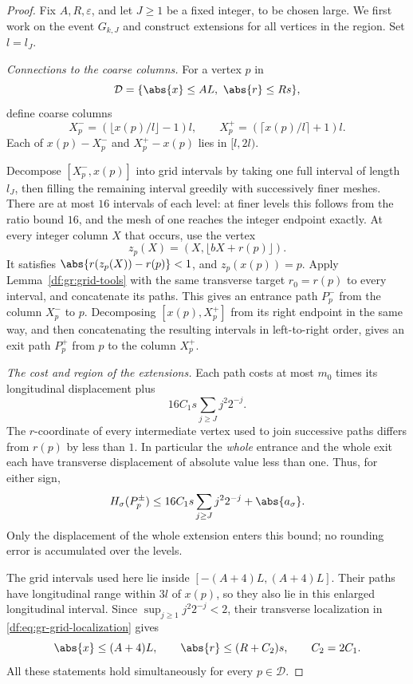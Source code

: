 \begin{proof}
Fix $A,R,\varepsilon$, and let $J\geq1$ be a fixed integer, to be chosen large.
We first work on the event $G_{k,J}$ and construct extensions for all
vertices in the region. Set $l=l_J$.

\emph{Connections to the coarse columns.}
For a vertex $p$ in
\[
 \mathcal D=\{\abs{x}\leq AL,\ \abs{r}\leq Rs\},
\]
define coarse columns
\[
 X_p^-=(\lfloor x(p)/l\rfloor-1)l,
 \qquad
 X_p^+=(\lceil x(p)/l\rceil+1)l.
\]
Each of $x(p)-X_p^-$ and $X_p^+-x(p)$ lies in $[l,2l)$.

Decompose $[X_p^-,x(p)]$ into grid intervals by taking one full interval
of length $l_J$, then filling the remaining interval greedily with
successively finer meshes. There are at most $16$ intervals of each
level: at finer levels this follows from the ratio bound $16$, and the
mesh of one reaches the integer endpoint exactly. At every integer
column $X$ that occurs, use the vertex
\[
 z_p(X)=(X,\lfloor bX+r(p)\rfloor).
\]
It satisfies $\abs{r(z_p(X))-r(p)}<1$, and $z_p(x(p))=p$. Apply
Lemma~\ref{df:gr:grid-tools} with the same transverse target $r_0=r(p)$
to every interval, and concatenate its paths. This gives an entrance
path $P_p^-$ from the column $X_p^-$ to $p$. Decomposing
$[x(p),X_p^+]$ from its right endpoint in the same way, and then
concatenating the resulting intervals in left-to-right order, gives an
exit path $P_p^+$ from $p$ to the column $X_p^+$.

\emph{The cost and region of the extensions.}
Each path costs at most $m_0$ times its longitudinal displacement plus
\begin{equation}\label{df:eq:gr-extension-error}
 16C_1s\sum_{j\geq J}j^2 2^{-j}.
\end{equation}
The $r$-coordinate of every intermediate vertex used to join successive
paths differs from $r(p)$ by less than $1$. In particular the
\emph{whole} entrance and the whole exit each have transverse
displacement of absolute value less than one. Thus, for either sign,
\begin{equation}\label{df:eq:gr-extension-defect}
 H_\sigma(P_p^\pm)
 \leq16C_1s\sum_{j\geq J}j^2 2^{-j}+\abs{a_\sigma}.
\end{equation}
Only the displacement of the whole extension enters this bound; no
rounding error is accumulated over the levels.

The grid intervals used here lie inside
$[-(A+4)L,(A+4)L]$. Their paths have longitudinal range within $3l$ of
$x(p)$, so they also lie in this enlarged longitudinal interval. Since
$\sup_{j\geq1}j^2 2^{-j}<2$, their transverse localization in
\eqref{df:eq:gr-grid-localization} gives
\begin{equation}\label{df:eq:gr-extension-region}
 \abs{x}\leq(A+4)L,\qquad
 \abs{r}\leq(R+C_2)s,
 \qquad C_2=2C_1.
\end{equation}
All these statements hold simultaneously for every $p\in\mathcal D$.


\end{proof}
